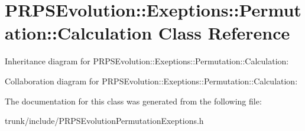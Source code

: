 \hypertarget{class_p_r_p_s_evolution_1_1_exeptions_1_1_permutation_1_1_calculation}{\section{P\-R\-P\-S\-Evolution\-:\-:Exeptions\-:\-:Permutation\-:\-:Calculation Class Reference}
\label{class_p_r_p_s_evolution_1_1_exeptions_1_1_permutation_1_1_calculation}
}


Inheritance diagram for P\-R\-P\-S\-Evolution\-:\-:Exeptions\-:\-:Permutation\-:\-:Calculation\-:


Collaboration diagram for P\-R\-P\-S\-Evolution\-:\-:Exeptions\-:\-:Permutation\-:\-:Calculation\-:


The documentation for this class was generated from the following file\-:\begin{DoxyCompactItemize}
\item 
trunk/include/P\-R\-P\-S\-Evolution\-Permutation\-Exeptions.\-h\end{DoxyCompactItemize}
